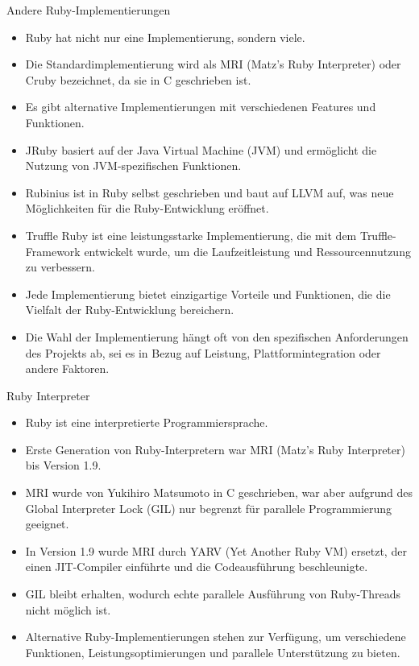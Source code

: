 \documentclass{beamer}
\begin{document}
\begin{frame}{Andere Ruby-Implementierungen}
  \begin{itemize}
    \item Ruby hat nicht nur eine Implementierung, sondern viele.
    \item Die Standardimplementierung wird als MRI (Matz's Ruby Interpreter) oder Cruby bezeichnet, da sie in C geschrieben ist.
    \item Es gibt alternative Implementierungen mit verschiedenen Features und Funktionen.
    \item JRuby basiert auf der Java Virtual Machine (JVM) und ermöglicht die Nutzung von JVM-spezifischen Funktionen.
    \item Rubinius ist in Ruby selbst geschrieben und baut auf LLVM auf, was neue Möglichkeiten für die Ruby-Entwicklung eröffnet.
    \item Truffle Ruby ist eine leistungsstarke Implementierung, die mit dem Truffle-Framework entwickelt wurde, um die Laufzeitleistung und Ressourcennutzung zu verbessern.
    \item Jede Implementierung bietet einzigartige Vorteile und Funktionen, die die Vielfalt der Ruby-Entwicklung bereichern.
    \item Die Wahl der Implementierung hängt oft von den spezifischen Anforderungen des Projekts ab, sei es in Bezug auf Leistung, Plattformintegration oder andere Faktoren.
  \end{itemize}
\end{frame}
\begin{frame}{Ruby Interpreter}
  \begin{itemize}
    \item Ruby ist eine interpretierte Programmiersprache.
    \item Erste Generation von Ruby-Interpretern war MRI (Matz's Ruby Interpreter) bis Version 1.9.
    \item MRI wurde von Yukihiro Matsumoto in C geschrieben, war aber aufgrund des Global Interpreter Lock (GIL) nur begrenzt für parallele Programmierung geeignet.
    \item In Version 1.9 wurde MRI durch YARV (Yet Another Ruby VM) ersetzt, der einen JIT-Compiler einführte und die Codeausführung beschleunigte.
    \item GIL bleibt erhalten, wodurch echte parallele Ausführung von Ruby-Threads nicht möglich ist.
    \item Alternative Ruby-Implementierungen stehen zur Verfügung, um verschiedene Funktionen, Leistungsoptimierungen und parallele Unterstützung zu bieten.
  \end{itemize}
\end{frame}
\end{document}
